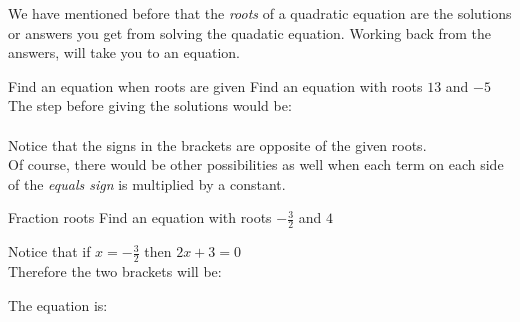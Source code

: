 We have mentioned before that the \textit{roots} of a quadratic equation are the solutions or answers you get from solving the quadatic equation.  Working back from the answers, will take you to an equation.

\begin{wex}{Find an equation when roots are given}
{Find an equation with roots $13$ and $-5$\\}{
The step before giving the solutions would be:\\
\\
Notice that the signs in the brackets are opposite of the given roots.\\
Of course, there would be other possibilities as well when each term on each side of the \textit{equals sign} is multiplied by a constant.}
\end{wex}

\begin{wex}{Fraction roots}
{Find an equation with roots $-\frac{3}{2}$  and $4$\\}{
Notice that if $x = -\frac{3}{2}$ then $2x + 3 = 0$\\
Therefore the two brackets will be:\\

The equation is:\\
}
\end{wex}

